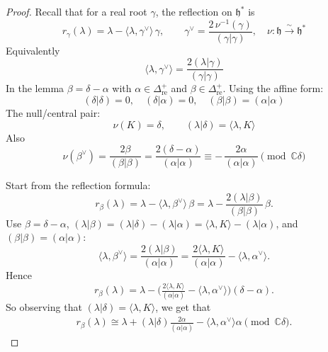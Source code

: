 \documentclass[12pt]{article}
\begin{document}
\begin{proof}
    Recall that for a real root $\gamma$, the reflection on $\mathfrak{h}^*$ is
    \[
        r_\gamma(\lambda)=\lambda-\langle\lambda,\gamma^\vee\rangle\,\gamma,
        \qquad
        \gamma^\vee=\frac{2\,\nu^{-1}(\gamma)}{(\gamma|\gamma)},\quad
        \nu:\mathfrak{h}\overset{\sim}{\to}\mathfrak{h}^*
    \]
    Equivalently
    \[
        \langle\lambda,\gamma^\vee\rangle=\frac{2(\lambda|\gamma)}{(\gamma|\gamma)}
    \]
    In the lemma $\beta=\delta-\alpha$ with $\alpha\in\Delta_{\mathrm{re}}^+$ and $\beta\in\Delta_{\mathrm{re}}^+$.
    Using the affine form:
    \[
        (\delta|\delta)=0,\quad (\delta|\alpha)=0,\quad (\beta|\beta)=(\alpha|\alpha)
    \]
    The null/central pair:
    \[
        \nu(K)=\delta,\qquad (\lambda|\delta)=\langle\lambda,K\rangle
    \]
    Also
    \[
        \nu(\beta^\vee)=\frac{2\beta}{(\beta|\beta)}=\frac{2(\delta-\alpha)}{(\alpha|\alpha)}
        \equiv -\,\frac{2\alpha}{(\alpha|\alpha)} \pmod{\mathbb{C}\delta}
    \]

    Start from the reflection formula:
    \[
        r_\beta(\lambda)=\lambda-\langle\lambda,\beta^\vee\rangle\,\beta
        =\lambda-\frac{2(\lambda|\beta)}{(\beta|\beta)}\,\beta.
    \]
    Use $\beta=\delta-\alpha$, $(\lambda|\beta)=(\lambda|\delta)-(\lambda|\alpha)=\langle\lambda,K\rangle-(\lambda|\alpha)$, and $(\beta|\beta)=(\alpha|\alpha)$:
    \[
        \langle\lambda,\beta^\vee\rangle
        = \frac{2(\lambda|\beta)}{(\alpha|\alpha)}
        = \frac{2\langle\lambda,K\rangle}{(\alpha|\alpha)}-\langle\lambda,\alpha^\vee\rangle .
    \]
    Hence
    \[
        r_\beta(\lambda)
        = \lambda -\Big(\tfrac{2\langle\lambda,K\rangle}{(\alpha|\alpha)}-\langle\lambda,\alpha^\vee\rangle\Big)(\delta-\alpha).
    \]
    So observing that $(\lambda|\delta) = \langle\lambda,K\rangle$, we get that \begin{align}
        r_\beta(\lambda) \cong \lambda + (\lambda|\delta)\frac{2\alpha}{(\alpha|\alpha)} - \langle\lambda,\alpha^\vee\rangle\alpha \pmod{\mathbb{C}\delta}.
    \end{align}


\end{proof}
\end{document}

